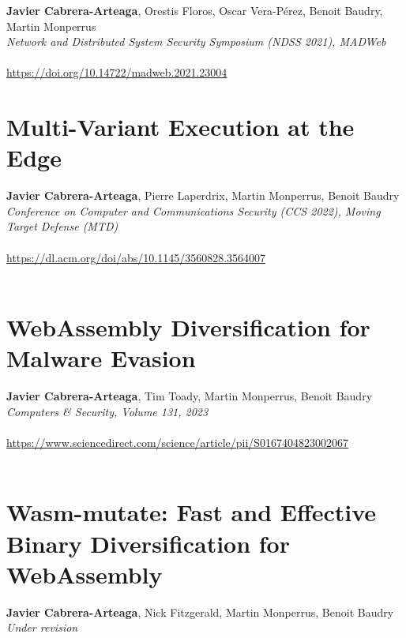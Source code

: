 \textbf{Javier Cabrera-Arteaga}, Orestis Floros, Oscar Vera-Pérez, Benoit Baudry, Martin Monperrus\\
\emph{Network and Distributed System Security Symposium (NDSS 2021), MADWeb}\\\\
\url{https://doi.org/10.14722/madweb.2021.23004}\\

%
    {} %
    {} %
    
\chapter{Multi-Variant Execution at the Edge}

\textbf{Javier Cabrera-Arteaga}, Pierre Laperdrix, Martin Monperrus, Benoit Baudry\\
\emph{Conference on Computer and Communications Security (CCS 2022), Moving Target Defense (MTD)}\\\\
 \url{https://dl.acm.org/doi/abs/10.1145/3560828.3564007}\\\\

%
    {} %
    {} %
    
\chapter{WebAssembly Diversification for Malware Evasion}

\textbf{Javier Cabrera-Arteaga}, Tim Toady, Martin Monperrus, Benoit Baudry\\
\emph{Computers \& Security, Volume 131, 2023}\\\\
\url{https://www.sciencedirect.com/science/article/pii/S0167404823002067}\\\\

%
    {} %
    {} %
    

\chapter{Wasm-mutate: Fast and Effective Binary Diversification for
WebAssembly}
\textbf{Javier Cabrera-Arteaga}, Nick Fitzgerald, Martin Monperrus, Benoit Baudry\\
\emph{Under revision}\\\\

